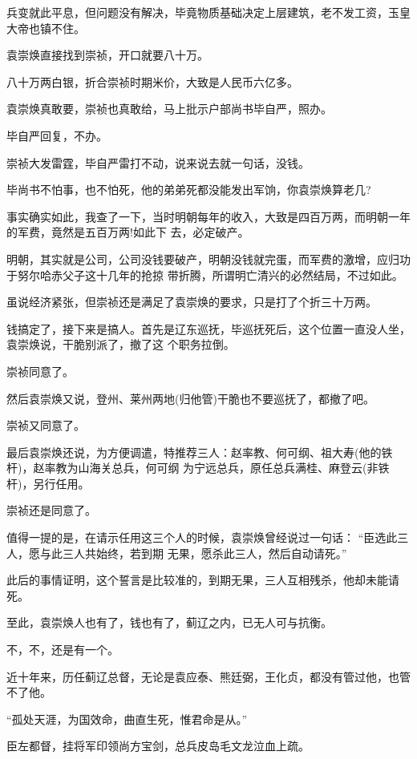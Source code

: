\documentclass[11pt,a4paper,onecolumn]{article}
\begin{document}
兵变就此平息，但问题没有解决，毕竟物质基础决定上层建筑，老不发工资，玉皇大帝也镇不住。

袁崇焕直接找到崇祯，开口就要八十万。

八十万两白银，折合崇祯时期米价，大致是人民币六亿多。

袁崇焕真敢要，崇祯也真敢给，马上批示户部尚书毕自严，照办。

毕自严回复，不办。

崇祯大发雷霆，毕自严雷打不动，说来说去就一句话，没钱。

毕尚书不怕事，也不怕死，他的弟弟死都没能发出军饷，你袁崇焕算老几?

事实确实如此，我查了一下，当时明朝每年的收入，大致是四百万两，而明朝一年的军费，竟然是五百万两!如此下
去，必定破产。

明朝，其实就是公司，公司没钱要破产，明朝没钱就完蛋，而军费的激增，应归功于努尔哈赤父子这十几年的抢掠
带折腾，所谓明亡清兴的必然结局，不过如此。

虽说经济紧张，但崇祯还是满足了袁崇焕的要求，只是打了个折\myrule 三十万两。

钱搞定了，接下来是搞人。首先是辽东巡抚，毕巡抚死后，这个位置一直没人坐，袁崇焕说，干脆别派了，撤了这
个职务拉倒。

崇祯同意了。

然后袁崇焕又说，登州、莱州两地(归他管)干脆也不要巡抚了，都撤了吧。

崇祯又同意了。

最后袁崇焕还说，为方便调遣，特推荐三人：赵率教、何可纲、祖大寿(他的铁杆)，赵率教为山海关总兵，何可纲
为宁远总兵，原任总兵满桂、麻登云(非铁杆)，另行任用。

崇祯还是同意了。

值得一提的是，在请示任用这三个人的时候，袁崇焕曾经说过一句话： ``臣选此三人，愿与此三人共始终，若到期
无果，愿杀此三人，然后自动请死。''

此后的事情证明，这个誓言是比较准的，到期无果，三人互相残杀，他却未能请死。

至此，袁崇焕人也有了，钱也有了，蓟辽之内，已无人可与抗衡。

不，不，还是有一个。

近十年来，历任蓟辽总督，无论是袁应泰、熊廷弼，王化贞，都没有管过他，也管不了他。

``孤处天涯，为国效命，曲直生死，惟君命是从。''

臣左都督，挂将军印领尚方宝剑，总兵皮岛毛文龙泣血上疏。

\section[\thesection]{}
\end{document}
